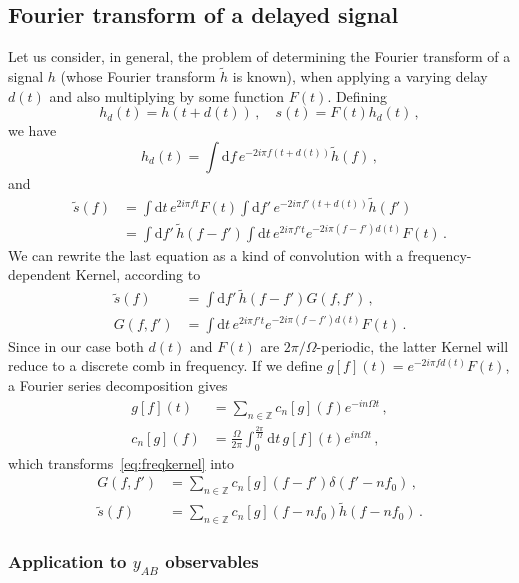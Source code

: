 \documentclass[aps,showpacs,%
prd,superscriptaddress,nofootinbib]{revtex4}
\newcommand{\be}{\begin{equation}}
\newcommand{\ee}{\end{equation}}
\newcommand\ud{{\mathrm{d}}}
\newcommand{\nn}{\nonumber}
\begin{document}
\subsection*{Fourier transform of a delayed signal}

Let us consider, in general, the problem of determining the Fourier transform of a signal $h$ (whose Fourier transform $\tilde{h}$ is known), when applying a varying delay $d(t)$ and also multiplying by some function $F(t)$. Defining
%
\be
	h_{d}(t) = h(t+d(t)) \,, \quad s(t) = F(t)h_{d}(t) \,,
\ee
%
we have
%
\be
	h_{d}(t) = \int \ud f \, e^{-2i\pi f (t+d(t))}\tilde{h}(f) \,,
\ee
%
and
%
\begin{align}
	\tilde{s}(f) &= \int \ud t \, e^{2i\pi f t} F(t)  \int \ud f' \, e^{-2i\pi f' (t+d(t))}\tilde{h}(f') \nn\\
	&= \int \ud f' \, \tilde{h}(f-f') \int \ud t \, e^{2i\pi f' t} e^{-2i\pi (f-f') d(t)} F(t) \,.
\end{align}
%
We can rewrite the last equation as a kind of convolution with a frequency-dependent Kernel, according to
%
\begin{align}\label{eq:freqkernel}
	\tilde{s}(f) &= \int \ud f' \, \tilde{h}(f-f') G(f,f') \,, \nn\\
	G(f,f') &= \int \ud t \, e^{2i\pi f' t} e^{-2i\pi (f-f') d(t)} F(t) \,.
\end{align}
%
Since in our case both $d(t)$ and $F(t)$ are $2\pi/\Omega$-periodic, the latter Kernel will reduce to a discrete comb in frequency. If we define $g[f](t) = e^{-2i\pi f d(t)} F(t)$, a Fourier series decomposition gives
%
\begin{align}
	g[f](t) &= \sum\limits_{n\in \mathbb{Z}} c_{n}[g](f) e^{-i n\Omega t} \,, \nn\\
	c_{n}[g](f) &= \frac{\Omega}{2\pi}\int_{0}^{\frac{2\pi}{\Omega}} \ud t \, g[f](t) e^{i n \Omega t} \,,
\end{align}
%
which transforms~\eqref{eq:freqkernel} into
%
\begin{align}
	G(f,f') &= \sum\limits_{n\in \mathbb{Z}} c_{n}[g](f-f') \delta\left(f' - n f_{0}\right) \,, \nn\\
	\tilde{s}(f) &= \sum\limits_{n\in \mathbb{Z}} c_{n}[g]\left(f - n f_{0}\right) \tilde{h}\left(f - n f_{0}\right) \,.
\end{align}
%


\subsubsection*{Application to $y_{AB}$ observables}
\end{document}
